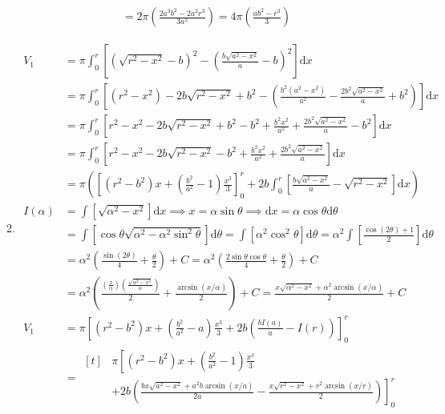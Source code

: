 \documentclass[12pt, A4]{report}
\renewcommand{\d}{\text{d}}
\begin{document}
\begin{enumerate}
\begin{enumerate}
\begin{align*}
									&= 2\pi\left(\frac{2a^3b^2 - 2a^2r^3}{3a^2}\right) 
										= 4\pi\left(\frac{ab^2 - r^3}{3}\right)
							\end{align*}
						\item
 							\begin{align*}
								V_1 &= \pi\int_0^r\left[\left(\sqrt{r^2 - x^2} - b\right)^2 - \left(\frac{b\sqrt{a^2 - x^2}}{a} - b\right)^2\right]\d x \\
									&= \pi\int_0^r\left[(r^2 - x^2) - 2b\sqrt{r^2 - x^2} + b^2 - \left(\frac{b^2(a^2 - x^2)}{a^2} -\frac{2b^2\sqrt{a^2 - x^2}}{a} + b^2\right)\right]\d x \\
									&= \pi\int_0^r\left[r^2 - x^2 - 2b\sqrt{r^2 - x^2} + b^2 - b^2 +  \frac{b^2x^2}{a^2} + \frac{2b^2\sqrt{a^2 - x^2}}{a} - b^2\right]\d x \\
									&= \pi\int_0^r\left[r^2 - x^2 - 2b\sqrt{r^2 - x^2} - b^2 + \frac{b^2x^2}{a^2} + \frac{2b^2\sqrt{a^2 - x^2}}{a}\right]\d x \\
									&= \pi\left(\left[(r^2 - b^2)x + \left(\frac{b^2}{a^2} - 1 \right)\frac{x^3}{3}\right]_0^r + 2b\int_0^r\left[ \frac{b\sqrt{a^2 - x^2}}{a} - \sqrt{r^2 - x^2}\right]\d x\right) \\
								I(\alpha) &= \int\left[\sqrt{\alpha^2 - x^2}\right]\d x 
										\implies x = \alpha\sin\theta 
										\implies \d x = \alpha\cos\theta\d\theta \\
									&= \int\left[\cos\theta\sqrt{\alpha^2 - \alpha^2\sin^2\theta}\right]\d\theta
										= \int\left[\alpha^2\cos^2\theta\right]\d\theta
										= \alpha^2\int\left[\frac{\cos(2\theta) + 1}{2}\right]\d\theta \\
									&= \alpha^2\left(\frac{\sin(2\theta)}{4} + \frac{\theta}{2}\right) + C
										= \alpha^2\left(\frac{2\sin\theta\cos\theta}{4} + \frac{\theta}{2}\right) + C \\
									&= \alpha^2\left(\frac{\left(\frac{x}{\alpha}\right)\left(\frac{\sqrt{\alpha^2 - x^2}}{\alpha}\right)}{2} + \frac{\arcsin(x/\alpha)}{2}\right) + C
										= \frac{x\sqrt{\alpha^2 - x^2} + \alpha^2\arcsin(x/\alpha)}{2} + C \\
									V_1 &= \pi\left[(r^2 - b^2)x + \left(\frac{b^2}{a^2} - a\right)\frac{x^3}{3} + 2b\left(\frac{bI(a)}{a} - I(r)\right)\right]_0^r \\
										&= \begin{aligned}[t] &\pi\left[(r^2 - b^2)x + \left(\frac{b^2}{a^2} - 1 \right)\frac{x^3}{3}\right. \\ 
											&\left.+ 2b\left(\frac{bx\sqrt{a^2 - x^2} + a^2b\arcsin(x/a)}{2a} - \frac{x\sqrt{r^2 - x^2} + r^2\arcsin(x/r)}{2}\right)\right]_0^r \end{aligned} \\

\end{align*}
\end{enumerate}
\end{enumerate}
\end{document}
